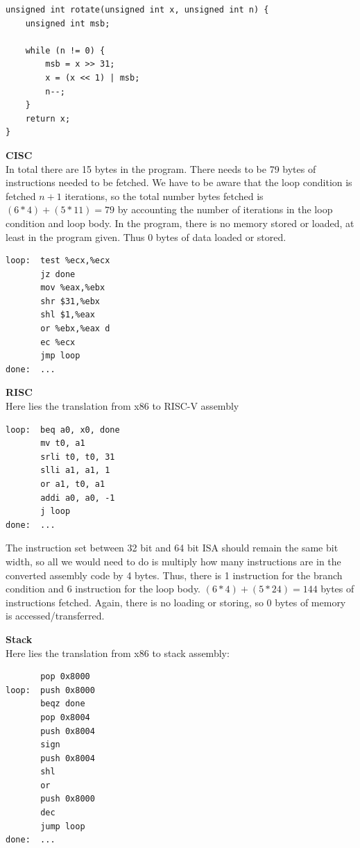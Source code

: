 \documentclass[11pt]{article}
\begin{document}

\lstset{language=c}
\begin{lstlisting}
unsigned int rotate(unsigned int x, unsigned int n) {
    unsigned int msb;

    while (n != 0) {
        msb = x >> 31;
        x = (x << 1) | msb;
        n--;
    }
    return x;
}
\end{lstlisting}

\begin{Parts}
	\Part \textbf{CISC} \\
	In total there are 15 bytes in the program. There needs to be 79 bytes of instructions needed to be fetched. We have to be aware that the loop condition is fetched $n + 1$ iterations, so the total number bytes fetched is $(6 * 4) + (5 * 11) = 79$ by accounting the number of iterations in the loop condition and loop body. In the program, there is no memory stored or loaded, at least in the program given. Thus 0 bytes of data loaded or stored. \\
	\begin{lstlisting}
loop:  test %ecx,%ecx 
       jz done
       mov %eax,%ebx 
       shr $31,%ebx 
       shl $1,%eax 
       or %ebx,%eax d
       ec %ecx
       jmp loop 
done:  ...
\end{lstlisting}
	\Part \textbf{RISC} \\
	Here lies the translation from x86 to RISC-V assembly \\
	\begin{lstlisting}
loop:  beq a0, x0, done
       mv t0, a1
       srli t0, t0, 31
       slli a1, a1, 1
       or a1, t0, a1
       addi a0, a0, -1
       j loop
done:  ...
\end{lstlisting}
	The instruction set between 32 bit and 64 bit ISA should remain the same bit width, so all we would need to do is multiply how many instructions are in the converted assembly code by 4 bytes. Thus, there is 1 instruction for the branch condition and 6 instruction for the loop body. $(6 * 4) + (5 * 24) = 144$ bytes of instructions fetched. Again, there is no loading or storing, so 0 bytes of memory is accessed/transferred.

	\Part \textbf{Stack} \\
	Here lies the translation from x86 to stack assembly: \\
	\begin{lstlisting}
       pop 0x8000
loop:  push 0x8000
       beqz done
       pop 0x8004
       push 0x8004
       sign
       push 0x8004
       shl
       or
       push 0x8000
       dec
	   jump loop
done:  ...
\end{lstlisting}


\end{Parts}
\end{document}
